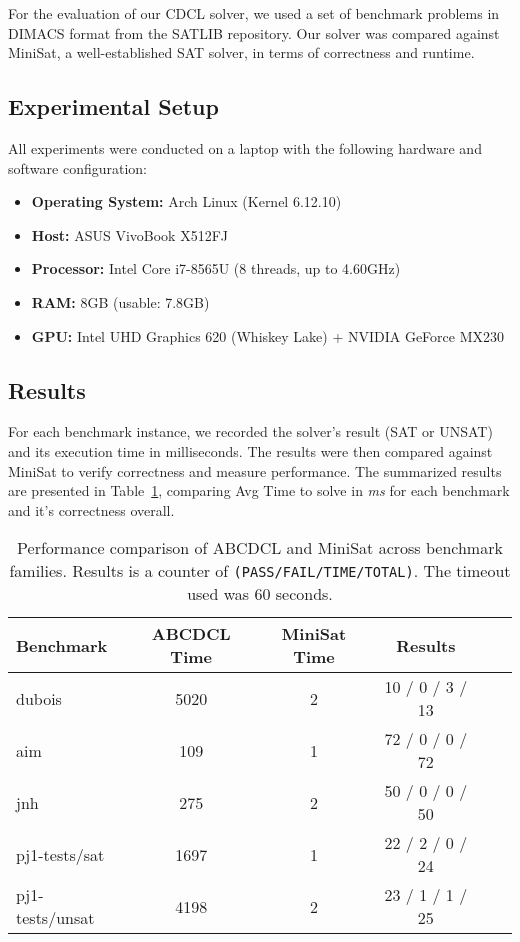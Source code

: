 \documentclass[a4paper,12pt]{article}
\begin{document}
For the evaluation of our CDCL solver, we used a set of benchmark problems in DIMACS
format from the SATLIB repository. Our solver was compared against MiniSat, a
well-established SAT solver, in terms of correctness and runtime.

\subsection{Experimental Setup}
All experiments were conducted on a laptop with the following hardware and software configuration:

\begin{itemize}
    \item \textbf{Operating System:} Arch Linux (Kernel 6.12.10)
    \item \textbf{Host:} ASUS VivoBook X512FJ
    \item \textbf{Processor:} Intel Core i7-8565U (8 threads, up to 4.60GHz)
    \item \textbf{RAM:} 8GB (usable: 7.8GB)
    \item \textbf{GPU:} Intel UHD Graphics 620 (Whiskey Lake) + NVIDIA GeForce MX230
\end{itemize}

\subsection{Results}
For each benchmark instance, we recorded the solver’s result (SAT or UNSAT) and its
execution time in milliseconds. The results were then compared against MiniSat to
verify correctness and measure performance. The summarized results are presented in
Table~\ref{tab:results}, comparing Avg Time to solve in \textit{ms} for each benchmark
and it's correctness overall.

\begin{table}[h]
    \centering
    \begin{tabular}{|l|c|c|c|c|c|}
        \hline
        \textbf{Benchmark} & \textbf{ABCDCL Time} & \textbf{MiniSat Time} & \textbf{Results } \\
        \hline
        dubois             & 5020                 & 2                     & 10 / 0 / 3 / 13   \\
        aim                & 109                  & 1                     & 72 / 0 / 0 / 72   \\
        jnh                & 275                  & 2                     & 50 / 0 / 0 / 50   \\
        pj1-tests/sat      & 1697                 & 1                     & 22 / 2 / 0 / 24   \\
        pj1-tests/unsat    & 4198                 & 2                     & 23 / 1 / 1 / 25   \\
        \hline
    \end{tabular}
    \caption{Performance comparison of ABCDCL and MiniSat across benchmark families. Results is a
        counter of \texttt{(PASS/FAIL/TIME/TOTAL)}. The timeout used was $60$ seconds.}
    \label{tab:results}
\end{table}
\end{document}
